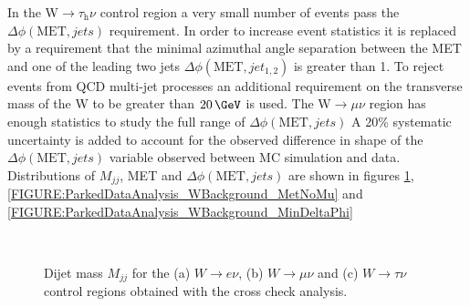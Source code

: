 In the W$\rightarrow\tau_{\mathrm{h}}\nu$ control region a very small number of events pass the $\Delta\phi(\text{MET},jets)$ requirement. In order to increase event statistics it is replaced by a requirement that the minimal azimuthal angle separation between the \gls{MET} and one of the leading two jets $\Delta\phi(\text{MET},jet_{1,2})$ is greater than 1. To reject events from \gls{QCD} multi-jet processes an additional requirement on the transverse mass of the W to be greater than $20\,\GeV$ is used. The W$\rightarrow\mu\nu$ region has enough statistics to study the full range of $\Delta\phi(\text{MET},jets)$ A 20\% systematic uncertainty is added to account for the observed difference in shape of the $\Delta\phi(\text{MET},jets)$ variable observed between \gls{MC} simulation and data. Distributions of $M_{jj}$, \gls{MET} and $\Delta\phi(\text{MET},jets)$ are shown in figures \ref{FIGURE:ParkedDataAnalysis_WBackground_Mjj}, \ref{FIGURE:ParkedDataAnalysis_WBackground_MetNoMu} and \ref{FIGURE:ParkedDataAnalysis_WBackground_MinDeltaPhi}

\begin{figure}[!htb]
\centering
{}
 \\
\caption{Dijet mass $M_{jj}$ for the (a) $W\rightarrow e\nu$, (b) $W\rightarrow\mu\nu$ and (c) $W\rightarrow\tau\nu$ control regions obtained with the cross check analysis.}
\label{FIGURE:ParkedDataAnalysis_WBackground_Mjj}
\end{figure}

